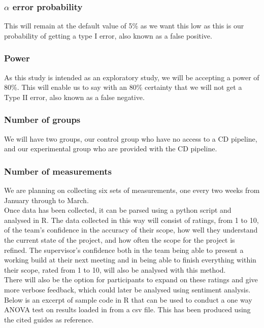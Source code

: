 \documentclass[journal]{IEEEtran}
\begin{document}
\subsubsection*{$\alpha$ error probability}
This will remain at the default value of 5\% as we want this low as this is our probability of getting a type I error, also known as a false positive\cite{errortype}.\\

\subsubsection*{Power}
As this study is intended as an exploratory study, we will be accepting a power of 80\%. This will enable us to say with an 80\% certainty that we will not get a Type II error, also known as a false negative\cite{errortype}.\\

\subsubsection*{Number of groups}
We will have two groups, our control group who have no access to a CD pipeline, and our experimental group who are provided with the CD pipeline.\\

\subsubsection*{Number of measurements}
We are planning on collecting six sets of measurements, one every two weeks from January through to March.\\


Once data has been collected, it can be parsed using a python script and analysed in R. The data collected in this way will consist of ratings, from 1 to 10, of the team's confidence in the accuracy of their scope, how well they understand the current state of the project, and how often the scope for the project is refined. The supervisor's confidence both in the team being able to present a working build at their next meeting and in being able to finish everything within their scope, rated from 1 to 10, will also be analysed with this method.\\
There will also be the option for participants to expand on these ratings and give more verbose feedback, which could later be analysed using sentiment analysis\cite{altrabsheh2014sentiment}. \\
Below is an excerpt of sample code in R that can be used to conduct a one way ANOVA test on results loaded in from a csv file. This has been produced using the cited guides as reference\cite{Rtutone,Rtuttwo}.
\end{document}
